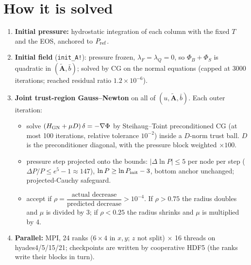 \documentclass[9pt]{extarticle}
\begin{document}
\section{How it is solved}
\begin{enumerate}
\item \textbf{Initial pressure:} hydrostatic integration of each column with the fixed $T$ and the EOS, anchored to $P_{\rm ref}$.
\item \textbf{Initial field} (\texttt{init\_A!}): pressure frozen, $\lambda_F=\lambda_Q=0$, so $\Phi_B+\Phi_S$ is quadratic in $(\tilde{\mathbf A},\bar b)$; solved by CG on the normal equations (capped at 3000 iterations; reached residual ratio $1.2\times10^{-6}$).
\item \textbf{Joint trust-region Gauss--Newton} on all of $(u,\tilde{\mathbf A},\bar b)$. Each outer iteration:
  \begin{itemize}
  \item solve $(H_{\rm GN}+\mu D)\,\delta=-\nabla\Phi$ by Steihaug--Toint preconditioned CG (at most 100 iterations, relative tolerance $10^{-2}$) inside a $D$-norm trust ball. $D$ is the preconditioner diagonal, with the pressure block weighted $\times100$.
  \item pressure step projected onto the bounds: $|\Delta\ln P|\le5$ per node per step ($\Delta P/P\le e^5-1\approx147$), $\ln P\ge\ln P_{\rm init}-3$, bottom anchor unchanged; projected-Cauchy safeguard.
  \item accept if $\rho=\dfrac{\text{actual decrease}}{\text{predicted decrease}}>10^{-4}$. If $\rho>0.75$ the radius doubles and $\mu$ is divided by 3; if $\rho<0.25$ the radius shrinks and $\mu$ is multiplied by 4.
  \end{itemize}
\item \textbf{Parallel:} MPI, 24 ranks ($6\times4$ in $x,y$; $z$ not split) $\times$ 16 threads on hyades4/5/15/21; checkpoints are written by cooperative HDF5 (the ranks write their blocks in turn).
\end{enumerate}
\end{document}
